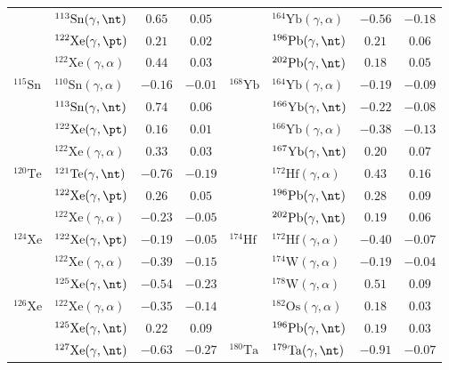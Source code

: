 {\begin{longtable}{llcc llcc}
$ $ & $^{113}\mathrm{Sn}(\gamma,\nt)$ & $0.65$ & $0.05$ & $ $ & $^{164}\mathrm{Yb}(\gamma,\alpha)$ & $-0.56$ & $-0.18$ \\ 
$ $ & $^{122}\mathrm{Xe}(\gamma,\pt)$ & $0.21$ & $0.02$ & $ $ & $^{196}\mathrm{Pb}(\gamma,\nt)$ & $0.21$ & $0.06$ \\ 
$ $ & $^{122}\mathrm{Xe}(\gamma,\alpha)$ & $0.44$ & $0.03$ & $ $ & $^{202}\mathrm{Pb}(\gamma,\nt)$ & $0.18$ & $0.05$ \\ 
$^{115}\mathrm{Sn}$ & $^{110}\mathrm{Sn}(\gamma,\alpha)$ & $-0.16$ & $-0.01$ & $^{168}\mathrm{Yb}$ & $^{164}\mathrm{Yb}(\gamma,\alpha)$ & $-0.19$ & $-0.09$ \\ 
$ $ & $^{113}\mathrm{Sn}(\gamma,\nt)$ & $0.74$ & $0.06$ & $ $ & $^{166}\mathrm{Yb}(\gamma,\nt)$ & $-0.22$ & $-0.08$ \\ 
$ $ & $^{122}\mathrm{Xe}(\gamma,\pt)$ & $0.16$ & $0.01$ & $ $ & $^{166}\mathrm{Yb}(\gamma,\alpha)$ & $-0.38$ & $-0.13$ \\ 
$ $ & $^{122}\mathrm{Xe}(\gamma,\alpha)$ & $0.33$ & $0.03$ & $ $ & $^{167}\mathrm{Yb}(\gamma,\nt)$ & $0.20$ & $0.07$ \\ 
$^{120}\mathrm{Te}$ & $^{121}\mathrm{Te}(\gamma,\nt)$ & $-0.76$ & $-0.19$ & $ $ & $^{172}\mathrm{Hf}(\gamma,\alpha)$ & $0.43$ & $0.16$ \\ 
$ $ & $^{122}\mathrm{Xe}(\gamma,\pt)$ & $0.26$ & $0.05$ & $ $ & $^{196}\mathrm{Pb}(\gamma,\nt)$ & $0.28$ & $0.09$ \\ 
$ $ & $^{122}\mathrm{Xe}(\gamma,\alpha)$ & $-0.23$ & $-0.05$ & $ $ & $^{202}\mathrm{Pb}(\gamma,\nt)$ & $0.19$ & $0.06$ \\ 
$^{124}\mathrm{Xe}$ & $^{122}\mathrm{Xe}(\gamma,\pt)$ & $-0.19$ & $-0.05$ & $^{174}\mathrm{Hf}$ & $^{172}\mathrm{Hf}(\gamma,\alpha)$ & $-0.40$ & $-0.07$ \\ 
$ $ & $^{122}\mathrm{Xe}(\gamma,\alpha)$ & $-0.39$ & $-0.15$ & $ $ & $^{174}\mathrm{W}(\gamma,\alpha)$ & $-0.19$ & $-0.04$ \\ 
$ $ & $^{125}\mathrm{Xe}(\gamma,\nt)$ & $-0.54$ & $-0.23$ & $ $ & $^{178}\mathrm{W}(\gamma,\alpha)$ & $0.51$ & $0.09$ \\ 
$^{126}\mathrm{Xe}$ & $^{122}\mathrm{Xe}(\gamma,\alpha)$ & $-0.35$ & $-0.14$ & $ $ & $^{182}\mathrm{Os}(\gamma,\alpha)$ & $0.18$ & $0.03$ \\ 
$ $ & $^{125}\mathrm{Xe}(\gamma,\nt)$ & $0.22$ & $0.09$ & $ $ & $^{196}\mathrm{Pb}(\gamma,\nt)$ & $0.19$ & $0.03$ \\ 
$ $ & $^{127}\mathrm{Xe}(\gamma,\nt)$ & $-0.63$ & $-0.27$ & $^{180}\mathrm{Ta}$ & $^{179}\mathrm{Ta}(\gamma,\nt)$ & $-0.91$ & $-0.07$ \\ 

\end{longtable}}
